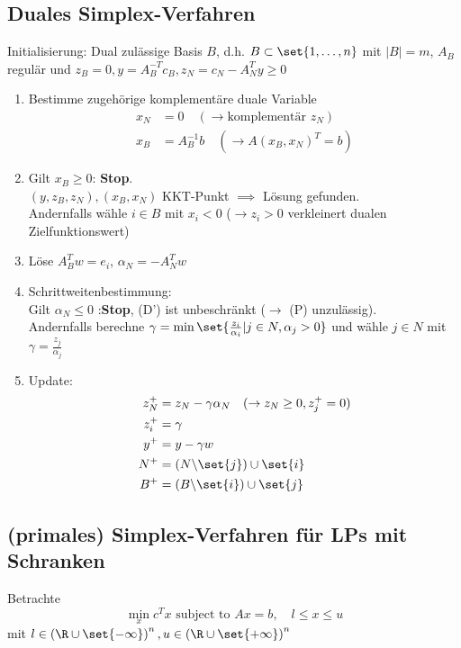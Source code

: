 \subsection{Duales Simplex-Verfahren}
Initialisierung: Dual zulässige Basis $B$, d.h. $B \subset \set{1,\dots ,n }$ mit $|B|=m$, $A_{B}$ regulär und $z_{B}=0,y=A_{B}^{-T}c_{B}, z_{N}= c_{N}-A_{N}^{T}y \geq 0$
\begin{enumerate}%
	\item Bestimme zugehörige komplementäre duale Variable
		\begin{align*}
			x_{N}&=0 \quad (\to \text{komplementär }z_{N})\\
			x_{B}&= A_{B}^{-1} b\quad ( \to A(x_{B},x_{N})^{T} =b)
		\end{align*}
	\item Gilt $x_{B} \geq 0 $: \textbf{Stop}.\\
		$(y,z_{B},z_{N}),(x_{B},x_{N})$ KKT-Punkt $\implies$ Lösung gefunden.\\
		Andernfalls wähle $ i \in B$ mit $x_{i}<0$ ($\to z_{i}>0$ verkleinert dualen Zielfunktionswert)
	\item Löse $A_{B}^{T} w = e_{i}$, $\alpha_{N} = -A_{N}^{T} w$
	\item Schrittweitenbestimmung:\\
		Gilt $\alpha_{N} \leq 0 $ :\textbf{Stop}, (D') ist unbeschränkt ($\to$ (P) unzulässig).\\
		Andernfalls berechne $\gamma = \min \set{ \frac{z_{i}}{\alpha_{i}}|j \in N , \alpha_{j} >0 }$ und wähle $j \in N$ mit $\gamma = \frac{z_{j}}{\alpha_{j}}$
	\item Update:
		\begin{align*}
			z_{N}^+ &= z_{N} - \gamma \alpha_{N} \quad (\to z_{N} \geq 0, z_{j}^+ =0)\\
			z_{i}^+ &= \gamma\\
			y^+ &= y -\gamma w\\
			N^+ &= (N \backslash \set{ j }) \cup \set{ i }\\
			B^+ &= (B \backslash \set{ i }) \cup \set{ j }
		\end{align*}
\end{enumerate}

\subsection{(primales) Simplex-Verfahren für LPs mit Schranken}
Betrachte
\begin{equation*}
	\min_{x} c^{T} x \text{ subject to } Ax = b ,\quad l \leq x \leq u
\end{equation*}
mit $l \in \left(\R \cup \set{ - \infty } \right)^n,u \in \left(\R \cup \set{ +\infty } \right)^n $

